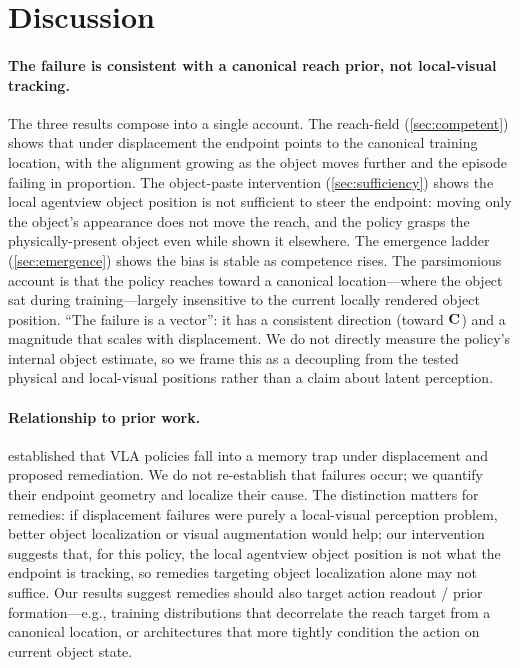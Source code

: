 \section{Discussion}
\label{sec:discussion}

\paragraph{The failure is consistent with a canonical reach prior, not local-visual tracking.} The three results compose into a single account. The reach-field (\cref{sec:competent}) shows that under displacement the endpoint points to the canonical training location, with the alignment growing as the object moves further and the episode failing in proportion. The object-paste intervention (\cref{sec:sufficiency}) shows the local agentview object position is not sufficient to steer the endpoint: moving only the object's appearance does not move the reach, and the policy grasps the physically-present object even while shown it elsewhere. The emergence ladder (\cref{sec:emergence}) shows the bias is stable as competence rises. The parsimonious account is that the policy reaches toward a canonical location---where the object sat during training---largely insensitive to the current locally rendered object position. ``The failure is a vector'': it has a consistent direction (toward $\mathbf{C}$) and a magnitude that scales with displacement. We do not directly measure the policy's internal object estimate, so we frame this as a decoupling from the tested physical and local-visual positions rather than a claim about latent perception.

\paragraph{Relationship to prior work.} \citet{afi2025memorytrap} established that VLA policies fall into a memory trap under displacement and proposed remediation. We do not re-establish that failures occur; we quantify their endpoint geometry and localize their cause. The distinction matters for remedies: if displacement failures were purely a local-visual perception problem, better object localization or visual augmentation would help; our intervention suggests that, for this policy, the local agentview object position is not what the endpoint is tracking, so remedies targeting object localization alone may not suffice. Our results suggest remedies should also target action readout / prior formation---e.g., training distributions that decorrelate the reach target from a canonical location, or architectures that more tightly condition the action on current object state.

